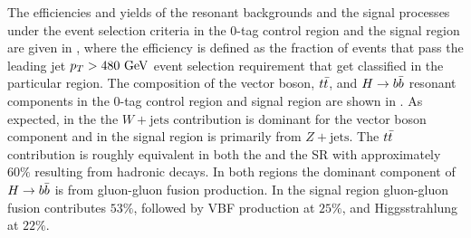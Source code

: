 The efficiencies and yields of the resonant backgrounds and the signal processes under the event selection criteria in the $0$-tag control region and the signal region are given in , where the efficiency is defined as the fraction of events that pass the leading \largeR{} jet $p_{T} > 480~\mathrm{GeV}$ event selection requirement that get classified in the particular region.
The composition of the vector boson, $t\bar{t}$, and $H \to b\bar{b}$ resonant components in the $0$-tag control region and signal region are shown in .
As expected, in the \CRQCD{} the $W+\mathrm{jets}$ contribution is dominant for the vector boson component and in the signal region is primarily from $Z+\mathrm{jets}$.
The $t\bar{t}$ contribution is roughly equivalent in both the \CRQCD{} and the SR with approximately $60\%$ resulting from hadronic decays.
In both regions the dominant component of $H \to b\bar{b}$ is from gluon-gluon fusion production. In the signal region gluon-gluon fusion contributes $53\%$, followed by VBF production at $25\%$, and Higgsstrahlung at $22\%$.

